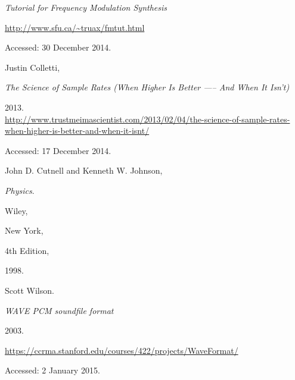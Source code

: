 \documentclass[12pt,twoside]{report}
\begin{document}
\begin{thebibliography}{99}

\emph{Tutorial for Frequency Modulation Synthesis}

\url{http://www.sfu.ca/~truax/fmtut.html}

Accessed: 30 December 2014.


Justin Colletti,

\emph{The Science of Sample Rates (When Higher Is Better —-- And When It Isn't)}

2013.\\
  \url{http://www.trustmeimascientist.com/2013/02/04/the-science-of-sample-rates-when-higher-is-better-and-when-it-isnt/}

Accessed: 17 December 2014.


John D. Cutnell and Kenneth W. Johnson,

\emph{Physics}.

Wiley,

New York,

4th Edition,

1998.


Scott Wilson.

\emph{WAVE PCM soundfile format}

2003.

\url{https://ccrma.stanford.edu/courses/422/projects/WaveFormat/}

Accessed: 2 January 2015.

\end{thebibliography}

\listoffigures
\end{document}
